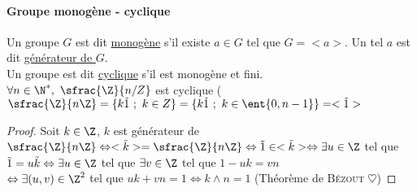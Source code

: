 		\paragraph{Groupe monogène - cyclique}
			Un groupe $G$ est dit \uline{monogène} s'il existe $a\in G$ tel que $G=<a>$. Un tel $a$ est dit \uline{générateur de $G$}.\\
			\hspace*{0.5cm} Un groupe est dit \uline{cyclique} s'il est monogène et fini. \trait
		\vspace*{-1.1cm} \\ $\forall n\in  \N^* ,~ \sfrac{\Z}{n/Z}$ est cyclique ( $ \sfrac{\Z}{n\Z} = \{k\tilde{1} ~;~k\in Z\} = \{k\tilde{1} ~;~ k\in \ent{0,n-1}\} = <\tilde{1}>$
		\vspace*{0.5cm} \\ 
		\begin{proof}
		Soit $k\in \Z$, 
		$k$ est générateur de $\sfrac{\Z}{n\Z} \Leftrightarrow <\tilde{k}> = \sfrac{\Z}{n\Z} \\
		\Leftrightarrow \tilde{1} \in <\tilde{k}> \Leftrightarrow \exists u\in \Z$ tel que $\tilde{1}=u\tilde{k} 
		\Leftrightarrow \exists u\in \Z$ tel que $\exists v\in \Z$ tel que $1-uk = vn$\\
		$\Leftrightarrow \exists (u,v)\in\Z^2$ tel que $uk+vn=1 \Leftrightarrow k\wedge n=1$ (Théorème de \textsc{Bézout} $\heartsuit$)
		\end{proof} ${}$ \traitd
